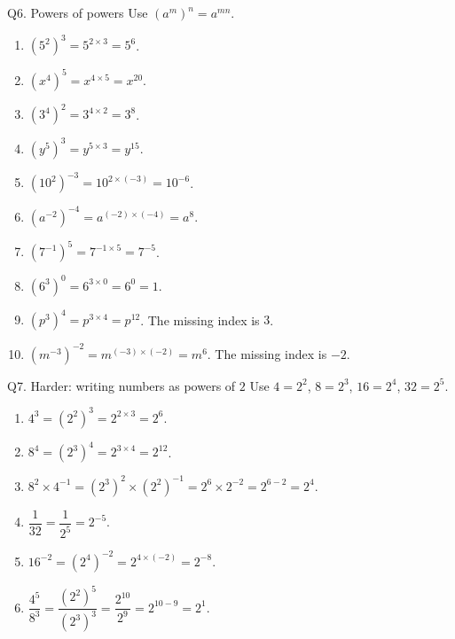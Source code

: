 \documentclass[12pt,a4paper]{article}
\begin{document}
\begin{solution}{Q6. Powers of powers}
Use \((a^m)^n=a^{mn}\).
\begin{enumerate}[label=\textbf{(\alph*)}]
\item \((5^2)^3=5^{2\times3}=5^6\).
\item \((x^4)^5=x^{4\times5}=x^{20}\).
\item \((3^4)^2=3^{4\times2}=3^8\).
\item \((y^5)^3=y^{5\times3}=y^{15}\).
\item \((10^2)^{-3}=10^{2\times(-3)}=10^{-6}\).
\item \((a^{-2})^{-4}=a^{(-2)\times(-4)}=a^8\).
\item \((7^{-1})^5=7^{-1\times5}=7^{-5}\).
\item \((6^3)^0=6^{3\times0}=6^0=1\).
\item \((p^3)^4=p^{3\times4}=p^{12}\). The missing index is \(3\).
\item \((m^{-3})^{-2}=m^{(-3)\times(-2)}=m^6\). The missing index is \(-2\).
\end{enumerate}
\end{solution}

\begin{solution}{Q7. Harder: writing numbers as powers of \(2\)}
Use \(4=2^2\), \(8=2^3\), \(16=2^4\), \(32=2^5\).
\begin{enumerate}[label=\textbf{(\alph*)}]
\item \(4^3=(2^2)^3=2^{2\times3}=2^6\).
\item \(8^4=(2^3)^4=2^{3\times4}=2^{12}\).
\item \(8^2\times4^{-1}=(2^3)^2\times(2^2)^{-1}=2^6\times2^{-2}=2^{6-2}=2^4\).
\item \(\dfrac1{32}=\dfrac1{2^5}=2^{-5}\).
\item \(16^{-2}=(2^4)^{-2}=2^{4\times(-2)}=2^{-8}\).
\item \(\dfrac{4^5}{8^3}=\dfrac{(2^2)^5}{(2^3)^3}=\dfrac{2^{10}}{2^9}=2^{10-9}=2^1\).
\end{enumerate}
\end{solution}
\end{document}
